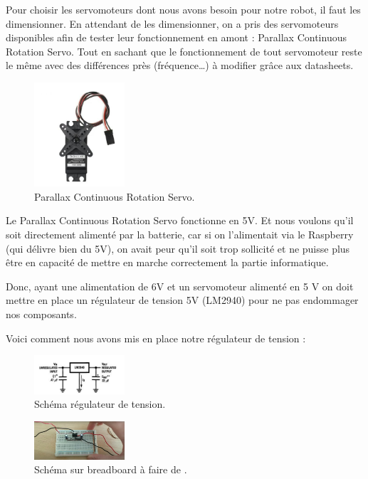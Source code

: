\documentclass[a4paper,12pt]{report}  %
\begin{document}
Pour choisir les servomoteurs dont nous avons besoin pour notre robot, il faut les dimensionner. En attendant de les dimensionner, on a pris des servomoteurs disponibles afin de tester leur fonctionnement en amont : Parallax Continuous Rotation Servo. Tout en sachant que le fonctionnement de tout servomoteur reste le même avec des différences près (fréquence…) à modifier grâce aux datasheets. \\



\begin{figure}[H]
	\centering
	\includegraphics[width=0.3\textwidth]{./attachments/moteur_rotation.jpg}
	\caption{Parallax Continuous Rotation Servo.}
	
\end{figure}

Le Parallax Continuous Rotation Servo fonctionne en 5V. Et nous voulons qu’il soit directement alimenté par la batterie, car si on l'alimentait via le Raspberry (qui délivre bien du 5V), on avait peur qu’il soit trop sollicité et ne puisse plus être en capacité de mettre en marche correctement la partie informatique.

Donc, ayant une alimentation de 6V et un servomoteur alimenté en 5 V on doit mettre en place un régulateur de tension 5V (LM2940) pour ne pas endommager nos composants.

Voici comment nous avons mis en place notre régulateur de tension : 

\begin{figure}[H]
	\centering
	\includegraphics[width=0.3\textwidth]{./attachments/regulateur_schema.jpg}
	\caption{Schéma régulateur de tension.}
\end{figure}

\begin{figure}[H]
	\centering
	\includegraphics[width=0.3\textwidth]{./attachments/regulateur_breadboard.jpg}
	\caption{Schéma sur breadboard à faire de .}
\end{figure}
\end{document}
